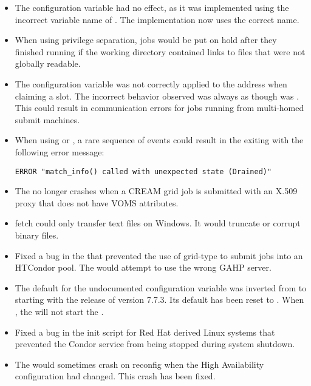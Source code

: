 \begin{itemize}
\item The configuration variable
 had no effect,
as it was implemented using the incorrect variable name of
.
The implementation now uses the correct name.

\item When using privilege separation, jobs would be put on hold after
they finished running if the working directory contained links to
files that were not globally readable.

\item The configuration variable 
was not correctly applied to the  address when
claiming a slot.  
The incorrect behavior observed was always as though
 was .
This could result
in communication errors for jobs running from multi-homed submit machines.

\item When using  or , a rare sequence of
events could result in the  exiting with the
following error message:

\begin{verbatim}
ERROR "match_info() called with unexpected state (Drained)"
\end{verbatim}

\item The  no longer crashes when a CREAM grid job
is submitted with an X.509 proxy that does not have VOMS attributes.

\item {} fetch could only transfer text files on Windows. It would
truncate or corrupt binary files.

\item Fixed a bug in the  that prevented the use
of grid-type  to submit jobs into an HTCondor pool.
The  would attempt to use the wrong GAHP server.

\item The default for the undocumented configuration variable
 was inverted from  to 
starting with the release of version 7.7.3. 
Its default has been reset to . 
When , the  will not start the .

\item Fixed a bug in the init script for Red Hat derived Linux systems that
prevented the Condor service from being stopped during system shutdown.

\item The  would sometimes crash on reconfig when the
High Availability configuration had changed. This crash has been fixed.

\end{itemize}

